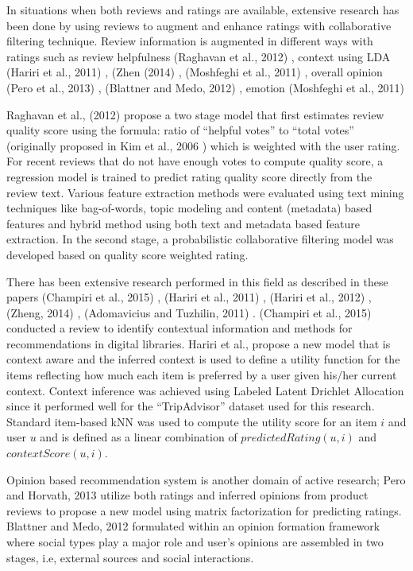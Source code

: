 \documentclass[12pt]{article}
\begin{document}
In situations when both reviews and ratings are available, extensive research has been done by using reviews to augment and enhance ratings with collaborative filtering technique. Review information is augmented in different ways with ratings such as review helpfulness (Raghavan et al., 2012) \cite{raghavan}, context using LDA (Hariri et al., 2011) \cite{hariri-2011}, (Zhen (2014) \cite{zheng}, (Moshfeghi et al., 2011) \cite{moshfeghi}, overall opinion (Pero et al., 2013) \cite{pero}, (Blattner and Medo, 2012) \cite{blattner}, emotion (Moshfeghi et al., 2011) \cite{moshfeghi}

Raghavan et al., (2012) \cite{raghavan} propose a two stage model that first estimates review quality score using the formula: ratio of ``helpful votes'' to ``total votes'' (originally proposed in Kim et al., 2006 \cite{kim}) which is weighted with the user rating. For recent reviews that do not have enough votes to compute quality score, a regression model is trained to predict rating quality score directly from the review text. Various feature extraction methods were evaluated using text mining techniques like bag-of-words, topic modeling and content (metadata) based features and hybrid method using both text and metadata based feature extraction. In the second stage, a probabilistic collaborative filtering model was developed based on quality score weighted rating. 

There has been extensive research performed in this field as described in these papers (Champiri et al., 2015) \cite{champiri}, (Hariri et al., 2011) \cite{hariri-2011}, (Hariri et al., 2012) \cite{hariri-2012}, (Zheng, 2014) \cite{zheng}, (Adomavicius and Tuzhilin, 2011) \cite{adomavicius-2011}. (Champiri et al., 2015) \cite{champiri} conducted a review to identify contextual information and methods for recommendations in digital libraries. Hariri et al., \cite{hariri-2011} propose a new model that is context aware and the inferred context is used to define a utility function for the items reflecting how much each item is preferred by a user given his/her current context. Context inference was achieved using Labeled Latent Drichlet Allocation since it performed well for the ``TripAdvisor'' dataset used for this research. Standard item-based kNN was used to compute the utility score for an item $i$ and user $u$ and is defined as a linear combination of $predictedRating(u, i)$ and $contextScore(u, i)$. 

Opinion based recommendation system is another domain of active research; Pero and Horvath, 2013 \cite{pero} utilize both ratings and inferred opinions from product reviews to propose a new model using matrix factorization for predicting ratings. Blattner and Medo, 2012 \cite{blattner} formulated within an opinion formation framework where social types play a major role and user's opinions are assembled in two stages, i.e, external sources and social interactions. 
\end{document}
